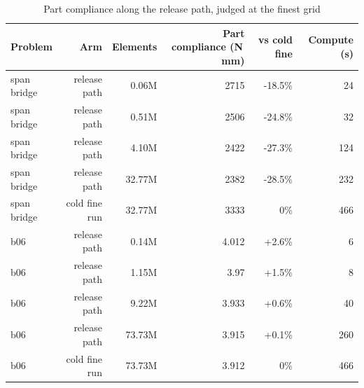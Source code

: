\begin{table}[t]
\centering\small
\caption{Part compliance along the release path, judged at the finest grid}
\label{tab:t9_x5_resolution}
\begin{tabular}{lrrrrr}
\toprule
Problem & Arm & Elements & Part compliance (N\,mm) & vs cold fine & Compute (s) \\
\midrule
span bridge & release path & 0.06M & 2715 & -18.5\% & 24 \\
span bridge & release path & 0.51M & 2506 & -24.8\% & 32 \\
span bridge & release path & 4.10M & 2422 & -27.3\% & 124 \\
span bridge & release path & 32.77M & 2382 & -28.5\% & 232 \\
span bridge & cold fine run & 32.77M & 3333 & 0\% & 466 \\
b06 & release path & 0.14M & 4.012 & +2.6\% & 6 \\
b06 & release path & 1.15M & 3.97 & +1.5\% & 8 \\
b06 & release path & 9.22M & 3.933 & +0.6\% & 40 \\
b06 & release path & 73.73M & 3.915 & +0.1\% & 260 \\
b06 & cold fine run & 73.73M & 3.912 & 0\% & 466 \\
\bottomrule
\end{tabular}
\end{table}
